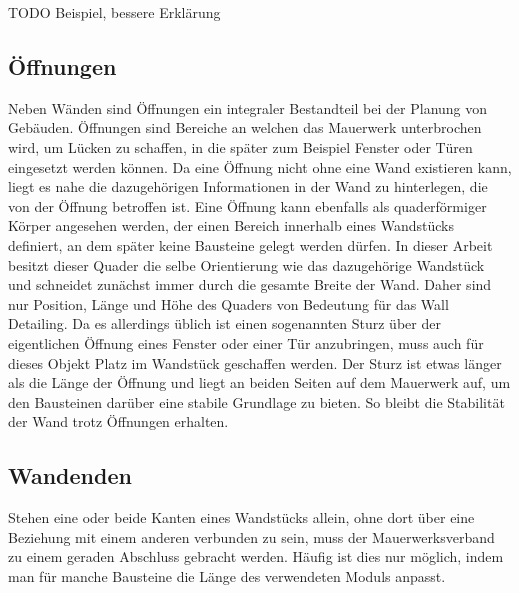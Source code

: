 TODO Beispiel, bessere Erklärung

\subsection{Öffnungen}
Neben Wänden sind Öffnungen ein integraler Bestandteil bei der Planung von Gebäuden.
Öffnungen sind Bereiche an welchen das Mauerwerk unterbrochen wird, um Lücken zu schaffen, in die später zum Beispiel Fenster oder Türen eingesetzt werden können.
Da eine Öffnung nicht ohne eine Wand existieren kann, liegt es nahe die dazugehörigen Informationen in der Wand zu hinterlegen, die von der Öffnung betroffen ist.
Eine Öffnung kann ebenfalls als quaderförmiger Körper angesehen werden, der einen Bereich innerhalb eines Wandstücks definiert, an dem später keine Bausteine gelegt werden dürfen.
In dieser Arbeit besitzt dieser Quader die selbe Orientierung wie das dazugehörige Wandstück und schneidet zunächst immer durch die gesamte Breite der Wand.
Daher sind nur Position, Länge und Höhe des Quaders von Bedeutung für das Wall Detailing.
Da es allerdings üblich ist einen sogenannten Sturz über der eigentlichen Öffnung eines Fenster oder einer Tür anzubringen, muss auch für dieses Objekt Platz im Wandstück geschaffen werden. 
Der Sturz ist etwas länger als die Länge der Öffnung und liegt an beiden Seiten auf dem Mauerwerk auf, um den Bausteinen darüber eine stabile Grundlage zu bieten.
So bleibt die Stabilität der Wand trotz Öffnungen erhalten.

\subsection{Wandenden}
Stehen eine oder beide Kanten eines Wandstücks allein, ohne dort über eine Beziehung mit einem anderen verbunden zu sein, muss der Mauerwerksverband zu einem geraden Abschluss gebracht werden.
Häufig ist dies nur möglich, indem man für manche Bausteine die Länge des verwendeten Moduls anpasst.

